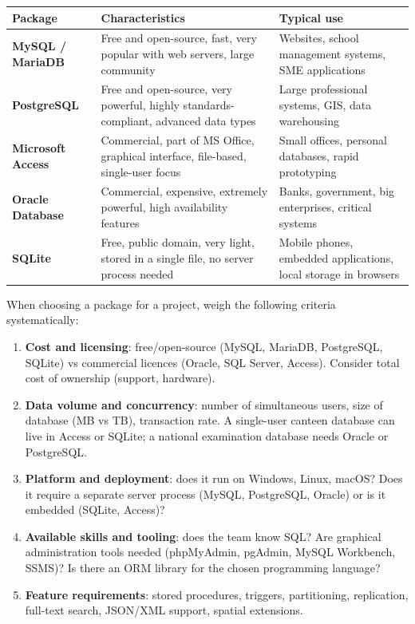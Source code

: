 \documentclass[11pt]{article}
\begin{document}
\begin{center}
\begin{tabularx}{\linewidth}{|l|X|X|}
\hline
\rowcolor{popblueL} \textbf{Package} & \textbf{Characteristics} & \textbf{Typical use} \\
\hline
\textbf{MySQL / MariaDB} & Free and open-source, fast, very popular with web servers, large community & Websites, school management systems, SME applications \\
\hline
\textbf{PostgreSQL} & Free and open-source, very powerful, highly standards-compliant, advanced data types & Large professional systems, GIS, data warehousing \\
\hline
\textbf{Microsoft Access} & Commercial, part of MS Office, graphical interface, file-based, single-user focus & Small offices, personal databases, rapid prototyping \\
\hline
\textbf{Oracle Database} & Commercial, expensive, extremely powerful, high availability features & Banks, government, big enterprises, critical systems \\
\hline
\textbf{SQLite} & Free, public domain, very light, stored in a single file, no server process needed & Mobile phones, embedded applications, local storage in browsers \\
\hline
\end{tabularx}
\end{center}

\begin{methode}
When choosing a package for a project, weigh the following criteria systematically:
\begin{enumerate}
\item \textbf{Cost and licensing}: free/open-source (MySQL, MariaDB, PostgreSQL, SQLite) vs commercial licences (Oracle, SQL Server, Access). Consider total cost of ownership (support, hardware).
\item \textbf{Data volume and concurrency}: number of simultaneous users, size of database (MB vs TB), transaction rate. A single-user canteen database can live in Access or SQLite; a national examination database needs Oracle or PostgreSQL.
\item \textbf{Platform and deployment}: does it run on Windows, Linux, macOS? Does it require a separate server process (MySQL, PostgreSQL, Oracle) or is it embedded (SQLite, Access)?
\item \textbf{Available skills and tooling}: does the team know SQL? Are graphical administration tools needed (phpMyAdmin, pgAdmin, MySQL Workbench, SSMS)? Is there an ORM library for the chosen programming language?
\item \textbf{Feature requirements}: stored procedures, triggers, partitioning, replication, full-text search, JSON/XML support, spatial extensions.
\end{enumerate}
\end{methode}
\end{document}
